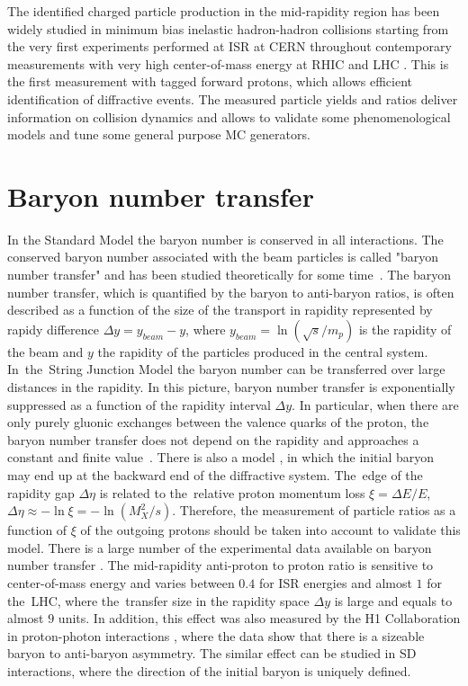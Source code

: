 The identified charged particle production in the mid-rapidity region has been widely studied in minimum bias inelastic hadron-hadron collisions starting from the very first experiments performed at ISR at CERN throughout contemporary measurements with very high center-of-mass energy at RHIC \cite{systmeasurhic} and LHC \cite{Adam:2015qaa}. This is the first measurement with tagged forward protons, 
which allows efficient identification of diffractive events. The measured particle yields and ratios deliver information on collision dynamics and allows to validate some phenomenological models and tune some general purpose MC generators.
\section{Baryon number transfer}
In the Standard Model the baryon 
number is conserved in all interactions. The conserved baryon number associated with the beam particles is called "baryon number transfer" and has been studied theoretically for some time~\cite{Kopeliovich:1988qm,Rossi:1977cy,Bopp:2000cr}. The baryon number transfer, which is quantified by the baryon to anti-baryon ratios, is often described as a function of the size of the transport in rapidity represented by
rapidy difference $\Delta y = y_{beam}-y$, where $y_{beam}=\ln\left(\sqrt{s}/m_p\right)$ is the rapidity of the beam and $y$ the rapidity of the particles produced in the central system. In~the~String Junction Model  \cite{Rossi:1977cy} the baryon number can be transferred over large distances in the rapidity. In this picture, baryon number transfer is exponentially suppressed as a function of the rapidity interval $\Delta y$. In particular, when there are only purely gluonic exchanges between the valence quarks of the proton, the baryon number transfer does not depend on the rapidity and approaches a constant and finite value~\cite{Kopeliovich:1988qm}. There is also a model \cite{Bopp:2000cr}, in which the initial baryon may end up at the backward end of the diffractive system. The~edge of the rapidity gap $\Delta\eta$ is related to the~relative proton momentum loss $\xi=\Delta E/E$, $\Delta\eta\approx-\ln\xi=-\ln\left(M_X^2/s\right)$. Therefore, the measurement of particle ratios as a function of $\xi$ of the outgoing protons should be taken into account to validate this model. There is a large number of the experimental data available on baryon number transfer \cite{Aamodt:2010dx}. The mid-rapidity  anti-proton to proton ratio is sensitive to center-of-mass energy  and varies between $0.4$ for ISR energies and almost $1$ for the~LHC, where the~transfer size in the rapidity space $\Delta y$ is large and equals to almost $9$ units. In addition, this effect was also measured by the H1 Collaboration in proton-photon interactions \cite{Kopeliovich:1998ps}, where the data show that there is a sizeable baryon to anti-baryon asymmetry. The similar effect can be studied in SD interactions, where the direction of the initial baryon is uniquely defined.


